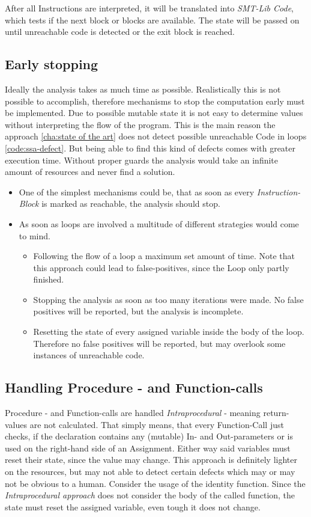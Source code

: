 After all Instructions are interpreted, it will be translated into \emph{SMT-Lib Code}, which tests if the next block or blocks are available. 
The state will be passed on until unreachable code is detected or the exit block is reached.

\subsection{Early stopping}
\label{sub:early stopping}
Ideally the analysis takes as much time as possible. Realistically this is not possible to accomplish, therefore mechanisms to stop the computation early must be implemented.
Due to possible mutable state it is not easy to determine values without interpreting the flow of the program. This is the main reason the approach \ref{cha:state of the art} does not detect possible unreachable Code in loops \ref{code:ssa-defect}. 
But being able to find this kind of defects comes with greater execution time. Without proper guards the analysis would take an infinite amount of resources and never find a solution.
\begin{itemize}
	\item One of the simplest mechanisms could be, that as soon as every \emph{Instruction-Block} is marked as reachable, the analysis should stop.
	\item As soon as loops are involved a multitude of different strategies would come to mind. 
	\begin{itemize}
		\item Following the flow of a loop a maximum set amount of time. Note that this approach could lead to false-positives, since the Loop only partly finished. 
		\item Stopping the analysis as soon as too many iterations were made. No false positives will be reported, but the analysis is incomplete.
		\item Resetting the state of every assigned variable inside the body of the loop. Therefore no false positives will be reported, but may overlook some instances of unreachable code.
	\end{itemize}
\end{itemize}

\subsection{Handling Procedure - and Function-calls}
\label{sub:handling procedure and function calls}
Procedure - and Function-calls are handled \emph{Intraprocedural} - meaning return-values are not calculated. That simply means, that every Function-Call just checks, if the declaration contains any (mutable) In- and Out-parameters or is used on the right-hand side of an Assignment.
Either way said variables must reset their state, since the value may change. 
This approach is definitely lighter on the resources, but may not able to detect certain defects which may or may not be obvious to a human. Consider the usage of the identity function. Since the \emph{Intraprocedural approach} does not consider the body of the called function, the state must reset the assigned variable, even tough it does not change.

